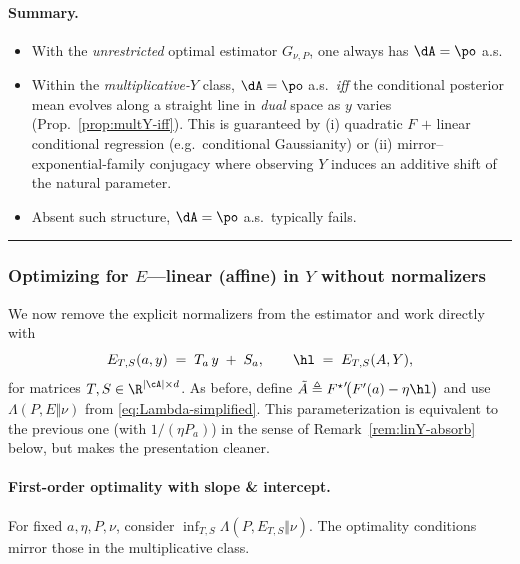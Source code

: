 \paragraph{Summary.}
\begin{itemize}
    \item With the \emph{unrestricted} optimal estimator $G_{\nu,P}$, one always has $\dA=\po$ a.s.
    \item Within the \emph{multiplicative-$Y$} class, $\dA=\po$ a.s.\ \emph{iff} the conditional posterior mean evolves along a straight line in \emph{dual} space as $y$ varies (Prop.~\ref{prop:multY-iff}). This is guaranteed by (i) quadratic $F$ $+$ linear conditional regression (e.g.\ conditional Gaussianity) or (ii) mirror–exponential-family conjugacy where observing $Y$ induces an additive shift of the natural parameter.
    \item Absent such structure, $\dA=\po$ a.s.\ typically fails.
\end{itemize}


\hrule

\subsubsection{Optimizing for $E$---linear (affine) in $Y$ without normalizers}
We now remove the explicit normalizers from the estimator and work directly with
\begin{equation}
    \label{eq:def-linY-no-norm}
    E_{T,S}(a,y)
    \;=\;
    T_a\,y \;+\; S_a,
    \qquad
    \hl \;=\; E_{T,S}(A,Y),
\end{equation}
for matrices $T,S \in \R^{|\cA|\times d}$.  As before, define
$\tilde{A}\triangleq {F^\star}'\!\big(F'(a)-\eta \hl\big)$ and use
$\Lambda(P,E\Vert \nu)$ from \eqref{eq:Lambda-simplified}.  This parameterization
is equivalent to the previous one (with $1/(\eta P_a)$) in the sense of
Remark~\ref{rem:linY-absorb} below, but makes the presentation cleaner.

\paragraph{First-order optimality with slope \& intercept.}
For fixed $a,\eta,P,\nu$, consider
\(
\inf_{T,S} \Lambda(P, E_{T,S}\Vert \nu)
\).
The optimality conditions mirror those in the multiplicative class.


